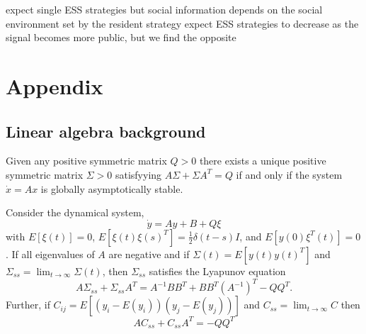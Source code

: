 \documentclass{article}
\begin{document}
expect single ESS strategies but social information depends on the social environment set by the resident strategy
expect ESS strategies to decrease as the signal becomes more public, but we find the opposite

\newpage
\section{Appendix}
\subsection{Linear algebra background }

\begin{theorem} \label{lyapeq_theorem}
Given any positive symmetric matrix $Q>0$ there exists a unique positive symmetric matrix $\Sigma>0$ satisfyying $A\Sigma+\Sigma A^T=Q$ if and only if the system $\dot{x}=Ax$ is globally asymptotically stable.
\end{theorem}

\begin{claim} \label{lyapeq_derivation}
Consider the dynamical system,
\begin{equation}
\dot{y}=Ay+B+Q\xi  \label{tofindsigma}
\end{equation}
with $E[\xi(t)]=0$, $E[\xi(t)\xi(s)^T]=\frac{1}{2}\delta(t-s)I$, and $E[y(0)\xi^T(t)]=0$. If all eigenvalues of $A$ are negative and if $\Sigma(t)=E[y(t)y(t)^T]$ and $\Sigma_{ss}=\lim_{t\to\infty}\Sigma(t)$, then $\Sigma_{ss}$ satisfies the Lyapunov equation
\begin{equation*}
A\Sigma_{ss}+\Sigma_{ss}A^T=A^{-1}BB^T+BB^T(A^{-1})^T-QQ^T.
\end{equation*}
Further, if $C_{ij}=E[(y_i-E(y_i))(y_j-E(y_j))]$ and $C_{ss}=\lim_{t\to\infty}C$ then 
\begin{equation*}
AC_{ss}+C_{ss}A^T=-QQ^T
\end{equation*}
\end{claim}
\end{document}
